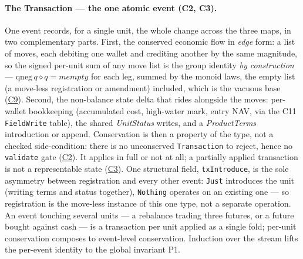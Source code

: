 \paragraph{The Transaction --- the one atomic event (C2, C3).}
One event records, for a single unit, the whole change across the three maps, in two
complementary parts. First, the conserved economic flow in \emph{edge} form: a list of
moves, each debiting one wallet and crediting another by the same magnitude, so the signed
per-unit sum of any move list is the group identity \emph{by construction} ---
$\mathrm{qneg}\,q \mathrel{\diamond} q = \mathit{mempty}$ for each leg, summed by the monoid
laws, the empty list (a move-less registration or amendment) included, which is the vacuous
base (\hyperref[cond:C9]{C9}). Second, the non-balance state delta that rides alongside the
moves: per-wallet bookkeeping (accumulated cost, high-water mark, entry NAV, via the C11
\texttt{FieldWrite} table), the shared \emph{UnitStatus} writes, and a \emph{ProductTerms}
introduction or append. Conservation is then a property of the type, not a checked
side-condition: there is no unconserved \texttt{Transaction} to reject, hence no
\texttt{validate} gate (\hyperref[cond:C2]{C2}). It applies in full or not at all; a
partially applied transaction is not a representable state (\hyperref[cond:C3]{C3}). One
structural field, \texttt{txIntroduce}, is the sole asymmetry between registration and every
other event: \texttt{Just} introduces the unit (writing terms and status together),
\texttt{Nothing} operates on an existing one --- so registration is the move-less instance of
this one type, not a separate operation. An event touching several units --- a rebalance
trading three futures, or a future bought against cash --- is a transaction per unit applied
as a single fold; per-unit conservation composes to event-level conservation. Induction over
the stream lifts the per-event identity to the global invariant P1.

